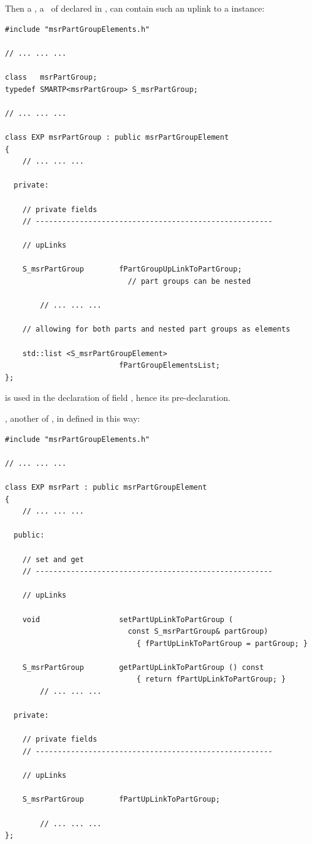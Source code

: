 Then a , a \subClass\ of  declared in , can contain such an uplink to a  instance:
\begin{lstlisting}[language=CPlusPlus]
#include "msrPartGroupElements.h"

// ... ... ...

class   msrPartGroup;
typedef SMARTP<msrPartGroup> S_msrPartGroup;

// ... ... ...

class EXP msrPartGroup : public msrPartGroupElement
{
	// ... ... ...

  private:

    // private fields
    // ------------------------------------------------------

    // upLinks

    S_msrPartGroup        fPartGroupUpLinkToPartGroup;
                            // part groups can be nested

		// ... ... ...

    // allowing for both parts and nested part groups as elements

    std::list <S_msrPartGroupElement>
                          fPartGroupElementsList;
};
\end{lstlisting}

 is used in the declaration of field , hence its pre-declaration.

, another \subClass of , in defined in  this way:
\begin{lstlisting}[language=CPlusPlus]
#include "msrPartGroupElements.h"

// ... ... ...

class EXP msrPart : public msrPartGroupElement
{
	// ... ... ...

  public:

    // set and get
    // ------------------------------------------------------

    // upLinks

    void                  setPartUpLinkToPartGroup (
                            const S_msrPartGroup& partGroup)
                              { fPartUpLinkToPartGroup = partGroup; }

    S_msrPartGroup        getPartUpLinkToPartGroup () const
                              { return fPartUpLinkToPartGroup; }
		// ... ... ...

  private:

    // private fields
    // ------------------------------------------------------

    // upLinks

    S_msrPartGroup        fPartUpLinkToPartGroup;

		// ... ... ...
};
\end{lstlisting}

